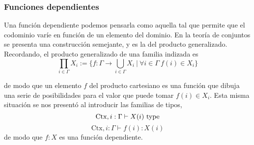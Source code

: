 \documentclass{article}
\begin{document}
    \subsubsection{Funciones dependientes}
        Una función dependiente podemos pensarla como aquella tal que permite
        que el codominio varíe en función de un elemento del dominio. En
        la teoría de conjuntos se presenta una construcción semejante, y es la
        del producto generalizado. Recordando, el producto generalizado de una
        familia indizada es
        $$
            \prod_{i \in \Gamma} X_i := 
            \{f : \Gamma \rightarrow \bigcup\limits_{i \in \Gamma} X_i\ 
                \vert\ \forall i \in \Gamma\ f(i) \in X_i\}
        $$

        de modo que un elemento $f$ del producto cartesiano es una función que
        dibuja una serie de posibilidades para el valor que puede tomar 
        $f(i) \in X_i$. Esta misma situación se nos presentó al introducir las
        familias de tipos,
        $$
            \mathrm{Ctx}, i : \Gamma \vdash X(i)\ \mathrm{type}
        $$
        $$
            \mathrm{Ctx}, i : \Gamma \vdash f(i) : X(i)
        $$
        de modo que $f : X$ es una función dependiente.
\end{document}
